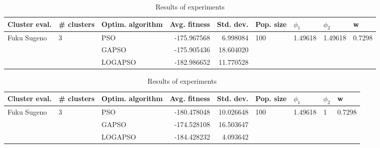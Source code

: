 \documentclass{article}
\begin{document}
\begin{table}
\centering
\caption{Results of experiments}
\begin{tabular}{lllrrllll}
\toprule
               Cluster eval. &        \# clusters & Optim. algorithm &  Avg. fitness &  Std. dev. &            Pop. size &               $\phi_{1}$ &               $\phi_{2}$ &                       w \\
\midrule
\multirow{3}{*}{Fuku Sugeno} & \multirow{3}{*}{3} &              PSO &   -175.967568 &   6.998084 & \multirow{3}{*}{100} & \multirow{3}{*}{1.49618} & \multirow{3}{*}{1.49618} & \multirow{3}{*}{0.7298} \\
                             &                    &            GAPSO &   -175.905436 &  18.604020 &                      &                          &                          &                         \\
                             &                    &          LOGAPSO &   -182.986652 &  11.770528 &                      &                          &                          &                         \\
\bottomrule
\end{tabular}
\end{table}
\begin{table}
\centering
\caption{Results of experiments}
\begin{tabular}{lllrrllll}
\toprule
               Cluster eval. &        \# clusters & Optim. algorithm &  Avg. fitness &  Std. dev. &            Pop. size &               $\phi_{1}$ &         $\phi_{2}$ &                       w \\
\midrule
\multirow{3}{*}{Fuku Sugeno} & \multirow{3}{*}{3} &              PSO &   -180.478048 &  10.026648 & \multirow{3}{*}{100} & \multirow{3}{*}{1.49618} & \multirow{3}{*}{1} & \multirow{3}{*}{0.7298} \\
                             &                    &            GAPSO &   -174.528108 &  16.503647 &                      &                          &                    &                         \\
                             &                    &          LOGAPSO &   -184.428232 &   4.093642 &                      &                          &                    &                         \\
\bottomrule
\end{tabular}
\end{table}
\end{document}
